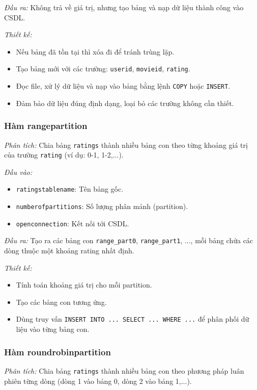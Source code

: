 \documentclass[14pt]{extarticle}
\begin{document}
\textit{Đầu ra:}  
Không trả về giá trị, nhưng tạo bảng và nạp dữ liệu thành công vào CSDL.

\textit{Thiết kế:}
\begin{itemize}
    \item Nếu bảng đã tồn tại thì xóa đi để tránh trùng lặp.
    \item Tạo bảng mới với các trường: \texttt{userid}, \texttt{movieid}, \texttt{rating}.
    \item Đọc file, xử lý dữ liệu và nạp vào bảng bằng lệnh \texttt{COPY} hoặc \texttt{INSERT}.
    \item Đảm bảo dữ liệu đúng định dạng, loại bỏ các trường không cần thiết.
\end{itemize}

\subsubsection{Hàm rangepartition}

\textit{Phân tích:}  
Chia bảng \texttt{ratings} thành nhiều bảng con theo từng khoảng giá trị của trường \texttt{rating} (ví dụ: 0-1, 1-2,...).

\textit{Đầu vào:}
\begin{itemize}
    \item \texttt{ratingstablename}: Tên bảng gốc.
    \item \texttt{numberofpartitions}: Số lượng phân mảnh (partition).
    \item \texttt{openconnection}: Kết nối tới CSDL.
\end{itemize}

\textit{Đầu ra:}  
Tạo ra các bảng con \texttt{range\_part0}, \texttt{range\_part1}, ..., mỗi bảng chứa các dòng thuộc một khoảng rating nhất định.

\textit{Thiết kế:}
\begin{itemize}
    \item Tính toán khoảng giá trị cho mỗi partition.
    \item Tạo các bảng con tương ứng.
    \item Dùng truy vấn \texttt{INSERT INTO ... SELECT ... WHERE ...} để phân phối dữ liệu vào từng bảng con.
\end{itemize}


\subsubsection{Hàm roundrobinpartition}

\textit{Phân tích:}  
Chia bảng \texttt{ratings} thành nhiều bảng con theo phương pháp luân phiên từng dòng (dòng 1 vào bảng 0, dòng 2 vào bảng 1,...).
\end{document}
